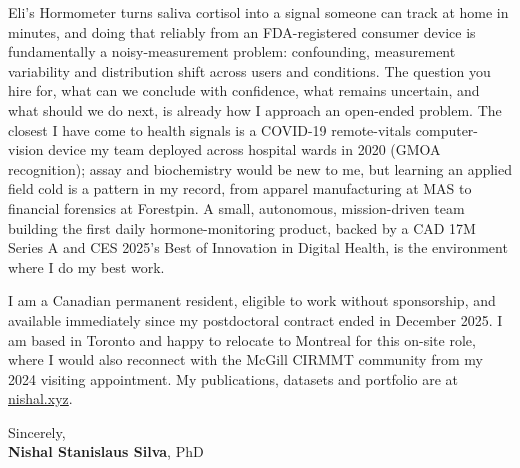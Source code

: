 \documentclass[11pt]{article}
\newcommand{\clName}{Nishal Stanislaus Silva}
\newcommand{\clSite}{https://nishal.xyz}
\begin{document}
Eli's Hormometer turns saliva cortisol into a signal someone can track at home in minutes, and doing that reliably from an FDA-registered consumer device is fundamentally a noisy-measurement problem: confounding, measurement variability and distribution shift across users and conditions. The question you hire for, what can we conclude with confidence, what remains uncertain, and what should we do next, is already how I approach an open-ended problem. The closest I have come to health signals is a COVID-19 remote-vitals computer-vision device my team deployed across hospital wards in 2020 (GMOA recognition); assay and biochemistry would be new to me, but learning an applied field cold is a pattern in my record, from apparel manufacturing at MAS to financial forensics at Forestpin. A small, autonomous, mission-driven team building the first daily hormone-monitoring product, backed by a CAD 17M Series A and CES 2025's Best of Innovation in Digital Health, is the environment where I do my best work.

I am a Canadian permanent resident, eligible to work without sponsorship, and available immediately since my postdoctoral contract ended in December 2025. I am based in Toronto and happy to relocate to Montreal for this on-site role, where I would also reconnect with the McGill CIRMMT community from my 2024 visiting appointment. My publications, datasets and portfolio are at \href{\clSite}{nishal.xyz}.

\vspace{10pt}
Sincerely,\\[2pt]
\textbf{\clName}, PhD
\end{document}
